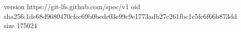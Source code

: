 version https://git-lfs.github.com/spec/v1
oid sha256:1de68d9680470cfcc69b0bede03e99c9e1773adb27c261fbc1c5fe6f66b873dd
size 175024
